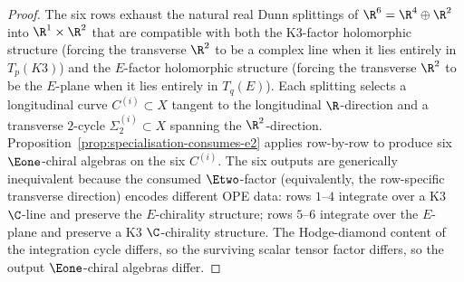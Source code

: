 \begin{proof}
The six rows exhaust the natural real Dunn splittings of $\R^6 = \R^4 \oplus \R^2$ into $\R^1 \times \R^2$ that are compatible with both the K3-factor holomorphic structure (forcing the transverse $\R^2$ to be a complex line when it lies entirely in $T_p(K3)$) and the $E$-factor holomorphic structure (forcing the transverse $\R^2$ to be the $E$-plane when it lies entirely in $T_q(E)$). Each splitting selects a longitudinal curve $C^{(i)} \subset X$ tangent to the longitudinal $\R$-direction and a transverse $2$-cycle $\Sigma_2^{(i)} \subset X$ spanning the $\R^2$-direction. Proposition~\ref{prop:specialisation-consumes-e2} applies row-by-row to produce six $\Eone$-chiral algebras on the six $C^{(i)}$. The six outputs are generically inequivalent because the consumed $\Etwo$-factor (equivalently, the row-specific transverse direction) encodes different OPE data: rows $1$--$4$ integrate over a K3 $\C$-line and preserve the $E$-chirality structure; rows $5$--$6$ integrate over the $E$-plane and preserve a K3 $\C$-chirality structure. The Hodge-diamond content of the integration cycle differs, so the surviving scalar tensor factor differs, so the output $\Eone$-chiral algebras differ.
\end{proof}

